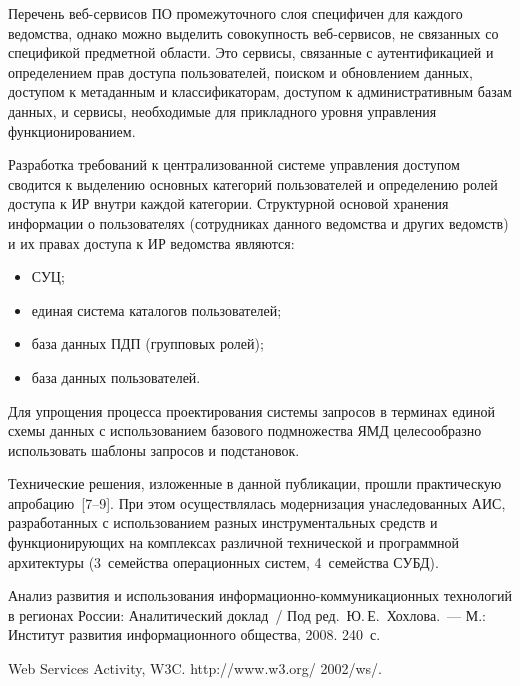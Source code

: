 \begin{multicols}{2}
      Перечень веб-сер\-ви\-сов ПО промежуточного слоя специфичен для каждого ведомства, 
однако можно выделить совокупность веб-сер\-ви\-сов, не связанных со спецификой предметной 
области. Это сервисы, связанные с аутентификацией и определением прав доступа 
пользователей, поиском и об\-нов\-ле\-ни\-ем данных, доступом к метаданным и классификаторам, 
доступом к административным базам данных, и сервисы, необходимые для прикладного 
уровня управления функционированием.
      
      Разработка требований к централизованной сис\-те\-ме управления доступом сводится к 
выделению основных категорий пользователей и определению ролей доступа к 
ИР внутри каждой категории. Структурной основой хранения 
информации о пользователях (сотрудниках данного ведомства и других ведомств) и их правах 
доступа к ИР ведомства являются:
      \begin{itemize}
\item СУЦ;
\item единая система каталогов пользователей;
\item база данных ПДП (групповых ролей);
\item база данных пользователей. 
\end{itemize}
      
      Для упрощения процесса проектирования сис\-те\-мы запросов в терминах единой схемы 
данных с использованием базового подмножества ЯМД целесообразно использовать шаблоны 
запросов и подстановок. 
      
      Технические решения, изложенные в данной пуб\-ли\-ка\-ции, прошли практическую 
апробацию~[7--9]. При этом осуществлялась модернизация унаследованных АИС, 
разработанных с использованием разных инструментальных средств и функционирующих на 
комплексах различной технической и программной архитектуры (3~семейства операционных 
систем, 4~семейства СУБД).

\vspace*{6pt}

{\small\frenchspacing
{%
\begin{thebibliography}{9}
     
Анализ развития и использования информационно-ком\-му\-ни\-ка\-ци\-он\-ных технологий в 
регионах России: Аналитический доклад~/ Под ред.\ Ю.\,Е.~Хохлова.~--- М.: Институт 
развития информационного общества, 2008.  240~с.

Web Services Activity, W3C. {\sf http://www.w3.org/ 2002/ws/}.


\end{thebibliography}}}
\end{multicols}
